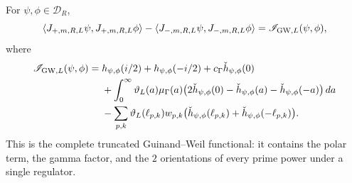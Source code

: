 \begin{lemma}
\label{lem:amp-rh-expansion-guinand-weil}
For \(\psi,\phi\in\mathcal D_R\),
\begin{equation}\label{eq:amp-rh-diferencia-columnas-regulada}
 \langle J_{+,m,R,L}\psi,J_{+,m,R,L}\phi\rangle
 -\langle J_{-,m,R,L}\psi,J_{-,m,R,L}\phi\rangle
 =
 \mathscr I_{{\rm GW},L}(\psi,\phi),
\end{equation}
where
\begin{align}
 \mathscr I_{{\rm GW},L}(\psi,\phi)
 ={}&
 h_{\psi,\phi}(i/2)+h_{\psi,\phi}(-i/2)
 +c_\Gamma\check h_{\psi,\phi}(0)                 \nonumber\\
 &+\int_0^\infty\vartheta_L(a)\mu_\Gamma(a)
 \bigl(
 2\check h_{\psi,\phi}(0)
 -\check h_{\psi,\phi}(a)
 -\check h_{\psi,\phi}(-a)
 \bigr)\,da                                       \nonumber\\
 &-\sum_{p,k}\vartheta_L(\ell_{p,k})w_{p,k}
 \bigl(
 \check h_{\psi,\phi}(\ell_{p,k})
 +\check h_{\psi,\phi}(-\ell_{p,k})
 \bigr).                              \label{eq:amp-rh-gw-truncado-explicito}
\end{align}
This is the complete truncated Guinand--Weil functional: it contains the polar term, the gamma factor, and the \(2\) orientations of every prime power under a single regulator.
\end{lemma}

